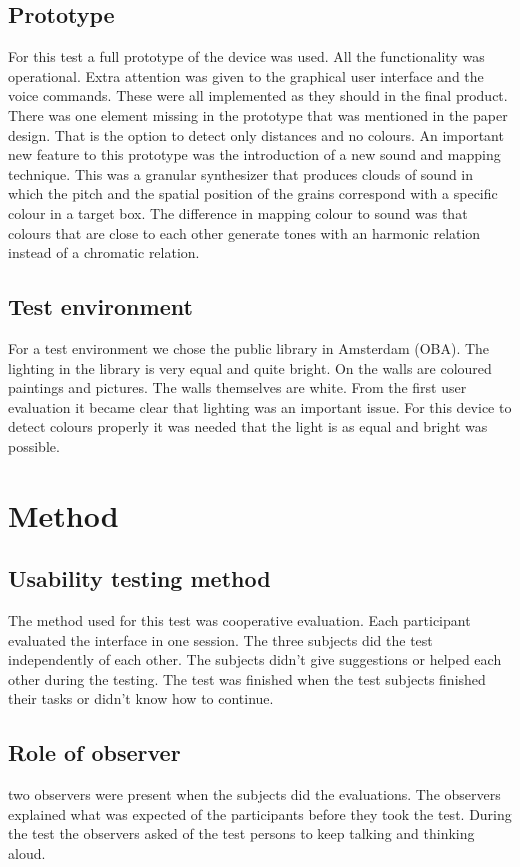 \documentclass[11pt]{article}
\begin{document}
\subsection{Prototype}
For this test a full prototype of the device was used. All the functionality was operational. Extra attention was given to the graphical user interface and the voice commands. These were all implemented as they should in the final product. There was one element missing in the prototype that was mentioned in the paper design. That is the option to detect only distances and no colours. 
An important new feature to this prototype was the introduction of a new sound and mapping technique. This was a granular synthesizer that produces clouds of sound in which the pitch and the spatial position of the grains correspond with a specific colour in a target box. The difference in mapping colour to sound was that colours that are close to each other generate tones with an harmonic relation instead of a chromatic relation.
\subsection{Test environment}
For a test environment we chose the public library in Amsterdam (OBA). The lighting in the library is very equal and quite bright. On the walls are coloured paintings and pictures. The walls themselves are white. From the first user evaluation it became clear that lighting was an important issue. For this device to detect colours properly it was needed that the light is as equal and bright was possible.

\section{Method}
\subsection{Usability testing method}
The method used for this test was cooperative evaluation. Each participant evaluated the interface in one session. The three subjects did the test independently of each other. The subjects didn't give suggestions or helped each other during the testing. The test was finished when the test subjects finished their tasks or didn't know how to continue.
\subsection{Role of observer}
two observers were present when the subjects did the evaluations. The observers explained what was expected of the participants before they took the test. During the test the observers asked of the test persons to keep talking and thinking aloud. 
\end{document}
